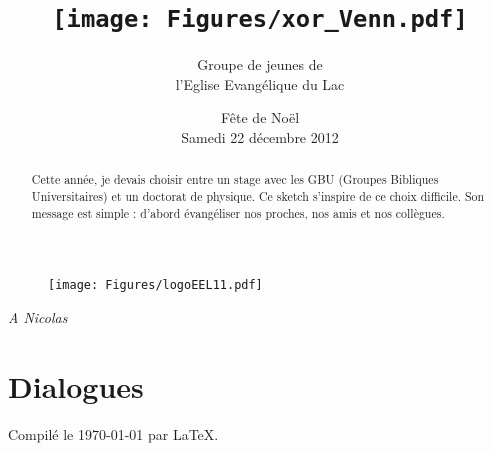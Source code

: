 \documentclass[12pt]{article}
\title{%
    \texttt{[image: Figures/xor\_Venn.pdf]}
}
\author{Groupe de jeunes de \\ l'Eglise Evangélique du Lac}
\date{Fête de Noël \\ Samedi 22 décembre 2012}
\begin{document}
\maketitle

	\begin{figure}[htb]
	\centering
	\texttt{[image: Figures/logoEEL11.pdf]}
	\end{figure}

\newpage

\begin{center}
\textit{A Nicolas}
\end{center}

\vfill

\begin{abstract}
Cette année, je devais choisir entre un stage avec les GBU
(Groupes Bibliques Universitaires) et un doctorat de physique.
Ce sketch s'inspire de ce choix difficile.
Son message est simple : d'abord évangéliser nos proches,
nos amis et nos collègues.
\end{abstract}

\setcounter{tocdepth}{2}
\tableofcontents

\vfill

\newpage



\newpage

\section{Dialogues}

	
	
	
	
\newpage
	


\vfill

\begin{center}
Compilé le \today{} par \LaTeX{}.
\end{center}
\end{document}
